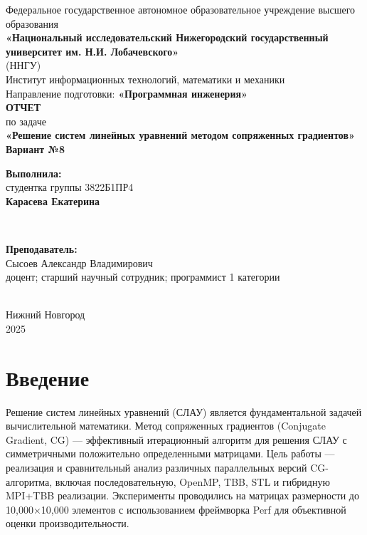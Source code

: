 \documentclass[12pt]{article}
\begin{document}
\begin{titlepage}
    \centering
    \large
    Федеральное государственное автономное образовательное учреждение высшего образования\\[0.5cm]
    \textbf{«Национальный исследовательский Нижегородский государственный университет им. Н.И. Лобачевского»}\\
    (ННГУ)\\[1cm]
    Институт информационных технологий, математики и механики\\[0.5cm]
    Направление подготовки: \textbf{«Программная инженерия»}\\[2cm]

    \vfill
    {\LARGE \textbf{ОТЧЕТ}}\\[0.5cm]
    {\Large по задаче}\\[0.5cm]
    {\LARGE \textbf{«Решение систем линейных уравнений методом сопряженных градиентов»}}\\[0.5cm]
    {\Large \textbf{Вариант №8}}\\[2.5cm]

    \hfill\parbox{0.5\textwidth}{
        \textbf{Выполнила:} \\
        студентка группы 3822Б1ПР4 \\
        \textbf{Карасева Екатерина}
    }\\[0.5cm]

    \hfill\parbox{0.5\textwidth}{
        \textbf{Преподаватель:} \\
        Сысоев Александр Владимирович \\
        доцент; старший научный сотрудник; программист 1 категории \\
    }\\[2cm]

    Нижний Новгород\\
    2025
\end{titlepage}

\thispagestyle{empty}
\clearpage
{} 
\setcounter{page}{2} 
\tableofcontents
\clearpage
\setcounter{page}{3} 
\section*{Введение}

Решение систем линейных уравнений (СЛАУ) является фундаментальной задачей вычислительной математики. Метод сопряженных градиентов (Conjugate Gradient, CG) — эффективный итерационный алгоритм для решения СЛАУ с симметричными положительно определенными матрицами. Цель работы — реализация и сравнительный анализ различных параллельных версий CG-алгоритма, включая последовательную, OpenMP, TBB, STL и гибридную MPI+TBB реализации. Эксперименты проводились на матрицах размерности до 10,000×10,000 элементов с использованием фреймворка Perf для объективной оценки производительности.
\end{document}
